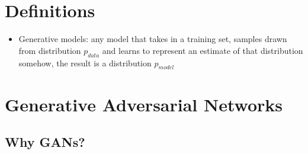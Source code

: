 \documentclass[../main.tex]{subfiles}
\begin{document}
\section{Definitions}
\begin{itemize}
  \item Generative models: any model that takes in a training set, samples drawn from distribution $p_{data}$ and learns to represent an estimate of that distribution somehow, the result is a distribution $p_{model}$
\end{itemize}


\section{Generative Adversarial Networks}
\subsection{Why GANs?}
\end{document}
